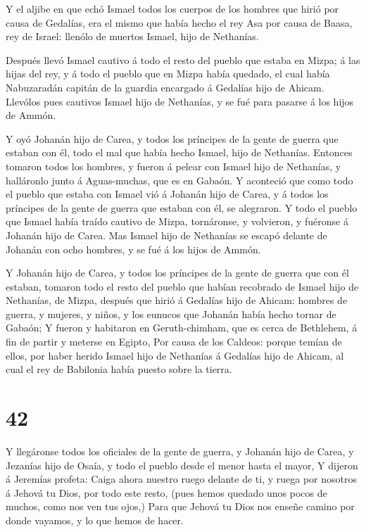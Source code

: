  Y el aljibe en que echó Ismael todos los cuerpos de los
hombres que hirió por causa de Gedalías, era el mismo que había hecho el
rey Asa por causa de Baasa, rey de Israel: llenólo de muertos Ismael,
hijo de Nethanías.

 Después llevó Ismael cautivo á todo el resto del pueblo
que estaba en Mizpa; á las hijas del rey, y á todo el pueblo que en
Mizpa había quedado, el cual había Nabuzaradán capitán de la guardia
encargado á Gedalías hijo de Ahicam. Llevólos pues cautivos Ismael hijo
de Nethanías, y se fué para pasarse á los hijos de Ammón.

 Y oyó Johanán hijo de Carea, y todos los príncipes de la
gente de guerra que estaban con él, todo el mal que había hecho Ismael,
hijo de Nethanías.  Entonces tomaron todos los hombres, y
fueron á pelear con Ismael hijo de Nethanías, y halláronlo junto á
Aguas-muchas, que es en Gabaón.  Y aconteció que como todo
el pueblo que estaba con Ismael vió á Johanán hijo de Carea, y á todos
los príncipes de la gente de guerra que estaban con él, se alegraron.
 Y todo el pueblo que Ismael había traído cautivo de Mizpa,
tornáronse, y volvieron, y fuéronse á Johanán hijo de Carea.
 Mas Ismael hijo de Nethanías se escapó delante de Johanán
con ocho hombres, y se fué á los hijos de Ammón.

 Y Johanán hijo de Carea, y todos los príncipes de la gente
de guerra que con él estaban, tomaron todo el resto del pueblo que
habían recobrado de Ismael hijo de Nethanías, de Mizpa, después que
hirió á Gedalías hijo de Ahicam: hombres de guerra, y mujeres, y niños,
y los eunucos que Johanán había hecho tornar de Gabaón;  Y
fueron y habitaron en Geruth-chimham, que es cerca de Bethlehem, á fin
de partir y meterse en Egipto,  Por causa de los Caldeos:
porque temían de ellos, por haber herido Ismael hijo de Nethanías á
Gedalías hijo de Ahicam, al cual el rey de Babilonia había puesto sobre
la tierra.

\hypertarget{section-41}{%
\section{42}\label{section-41}}

 Y llegáronse todos los oficiales de la gente de guerra, y
Johanán hijo de Carea, y Jezanías hijo de Osaía, y todo el pueblo desde
el menor hasta el mayor,  Y dijeron á Jeremías profeta:
Caiga ahora nuestro ruego delante de ti, y ruega por nosotros á Jehová
tu Dios, por todo este resto, (pues hemos quedado unos pocos de muchos,
como nos ven tus ojos,)  Para que Jehová tu Dios nos enseñe
camino por donde vayamos, y lo que hemos de hacer.

